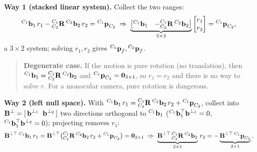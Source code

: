 \textbf{Way 1 (stacked linear system).} Collect the two ranges:
\begin{align}
{}^{C_1}\boldsymbol{\mathbf{b}}_1\, r_1 - {}^{C_1}_{C_2}\boldsymbol{\mathbf{R}}\,{}^{C_2}\boldsymbol{\mathbf{b}}_2\, r_2 = {}^{C_1}\boldsymbol{\mathbf{p}}_{C_2}
\;\Rightarrow\;
\underbrace{\begin{bmatrix} {}^{C_1}\boldsymbol{\mathbf{b}}_1 & -{}^{C_1}_{C_2}\boldsymbol{\mathbf{R}}\,{}^{C_2}\boldsymbol{\mathbf{b}}_2 \end{bmatrix}}_{3\times2}\begin{bmatrix} r_1 \\ r_2 \end{bmatrix} = {}^{C_1}\boldsymbol{\mathbf{p}}_{C_2},
\end{align}
a $3\times2$ system; solving $r_1,r_2$ gives ${}^{C_1}\boldsymbol{\mathbf{p}}_f,{}^{C_2}\boldsymbol{\mathbf{p}}_f$.
\begin{quote}
\textbf{Degenerate case.} If the motion is pure rotation (no translation), then ${}^{C_1}\boldsymbol{\mathbf{b}}_1 = {}^{C_1}_{C_2}\boldsymbol{\mathbf{R}}\,{}^{C_2}\boldsymbol{\mathbf{b}}_2$ and ${}^{C_1}\boldsymbol{\mathbf{p}}_{C_2} = \boldsymbol{\mathbf{0}}_{3\times1}$, so $r_1 = r_2$ and there is no way to solve $r$. For a monocular camera, pure rotation is dangerous.
\end{quote}
\textbf{Way 2 (left null space).} With ${}^{C_1}\boldsymbol{\mathbf{b}}_1\, r_1 = {}^{C_1}_{C_2}\boldsymbol{\mathbf{R}}\,{}^{C_2}\boldsymbol{\mathbf{b}}_2\, r_2 + {}^{C_1}\boldsymbol{\mathbf{p}}_{C_2}$, collect into $\boldsymbol{\mathbf{B}}^{\perp} = [\,\boldsymbol{\mathbf{b}}^{\perp_1}\;\;\boldsymbol{\mathbf{b}}^{\perp_2}\,]$ two directions orthogonal to ${}^{C_1}\boldsymbol{\mathbf{b}}_1$ (${}^{C_1}\boldsymbol{\mathbf{b}}_1^\top\boldsymbol{\mathbf{b}}^{\perp_1} = 0$, ${}^{C_1}\boldsymbol{\mathbf{b}}_1^\top\boldsymbol{\mathbf{b}}^{\perp_2} = 0$); projecting removes $r_1$:
\begin{align}
\boldsymbol{\mathbf{B}}^{\perp\top}\,{}^{C_1}\boldsymbol{\mathbf{b}}_1\, r_1 = \boldsymbol{\mathbf{B}}^{\perp\top}\big({}^{C_1}_{C_2}\boldsymbol{\mathbf{R}}\,{}^{C_2}\boldsymbol{\mathbf{b}}_2\, r_2 + {}^{C_1}\boldsymbol{\mathbf{p}}_{C_2}\big) = \boldsymbol{\mathbf{0}}_{2\times1}
\;\Rightarrow\;
\underbrace{\boldsymbol{\mathbf{B}}^{\perp\top}\,{}^{C_1}_{C_2}\boldsymbol{\mathbf{R}}\,{}^{C_2}\boldsymbol{\mathbf{b}}_2}_{2\times1}\, r_2 = -\underbrace{\boldsymbol{\mathbf{B}}^{\perp\top}\,{}^{C_1}\boldsymbol{\mathbf{p}}_{C_2}}_{2\times1}.
\end{align}

